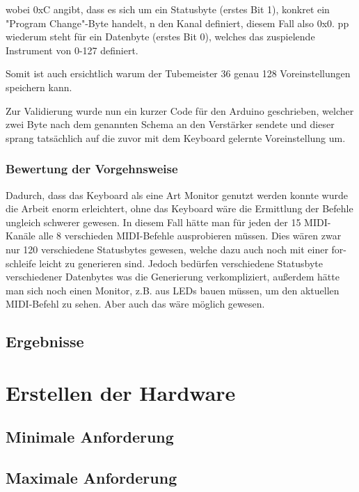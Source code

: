 \documentclass[10pt,a4paper]{report}
\begin{document}
\begin{flushleft}

wobei 0xC angibt, dass es sich um ein Statusbyte (erstes Bit 1), konkret ein "Program Change"-Byte handelt, n den Kanal definiert, diesem Fall also 0x0. pp wiederum steht für ein Datenbyte (erstes Bit 0), welches das zuspielende Instrument von 0-127 definiert. 

Somit ist auch ersichtlich warum der Tubemeister 36 genau 128 Voreinstellungen speichern kann.

Zur Validierung wurde nun ein kurzer Code für den Arduino geschrieben, welcher zwei Byte nach dem genannten Schema an den Verstärker sendete und dieser sprang tatsächlich auf die zuvor mit dem Keyboard gelernte Voreinstellung um.

\subsubsection{Bewertung der Vorgehnsweise}
Dadurch, dass das Keyboard als eine Art Monitor genutzt werden konnte wurde die Arbeit enorm erleichtert, ohne das Keyboard wäre die Ermittlung der Befehle ungleich schwerer gewesen. In diesem Fall hätte man für jeden der 15 MIDI-Kanäle alle 8 verschieden MIDI-Befehle ausprobieren müssen. Dies wären zwar nur 120 verschiedene Statusbytes gewesen, welche dazu auch noch mit einer for-schleife leicht zu generieren sind. Jedoch bedürfen verschiedene Statusbyte verschiedener Datenbytes was die Generierung verkompliziert, außerdem hätte man sich noch einen Monitor, z.B. aus LEDs bauen müssen, um den aktuellen MIDI-Befehl zu sehen. Aber auch das wäre möglich gewesen.


\end{flushleft}

\subsection{Ergebnisse}


\section{Erstellen der Hardware}
\subsection{Minimale Anforderung}
\subsection{Maximale Anforderung}
\end{document}
